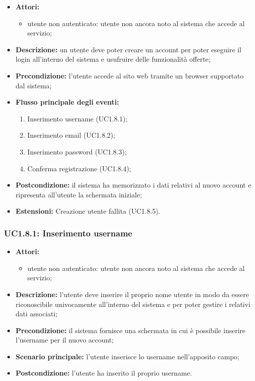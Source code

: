 \begin{itemize}
	\item \textbf{Attori:}
	\begin{itemize}
		\item utente non autenticato: utente non ancora noto al sistema che accede al servizio;
	\end{itemize}
	\item \textbf{Descrizione:} un utente deve poter creare un account per poter eseguire il login
	all'interno del sistema e usufruire delle funzionalità offerte;
	\item \textbf{Precondizione:} l'utente accede al sito web tramite un browser supportato
	dal sistema;
	\item \textbf{Flusso principale degli eventi:}
	\begin{enumerate}
		\item Inserimento username (UC1.8.1);
		\item Inserimento email (UC1.8.2);
		\item Inserimento password (UC1.8.3);
		\item Conferma registrazione (UC1.8.4);
	\end{enumerate}
	\item \textbf{Postcondizione:} il sistema ha memorizzato i dati relativi al nuovo account e
	ripresenta all'utente la schermata iniziale;
	\item \textbf{Estensioni:} Creazione utente fallita (UC1.8.5).
\end{itemize}

\subsubsection{UC1.8.1: Inserimento username}
\begin{itemize}
	\item \textbf{Attori:}
	\begin{itemize}
		\item utente non autenticato: utente non ancora noto al sistema che accede al servizio;
	\end{itemize}
	\item \textbf{Descrizione:} l'utente deve inserire il proprio nome utente in modo da essere riconoscibile univocamente all'interno del sistema e per poter gestire i relativi dati associati;
	\item \textbf{Precondizione:} il sistema fornisce una schermata in cui è possibile inserire l'username per il nuovo account;
	\item \textbf{Scenario principale:} l'utente inserisce lo username nell'apposito campo;
	\item \textbf{Postcondizione:} l'utente ha inserito il proprio username.
\end{itemize}

